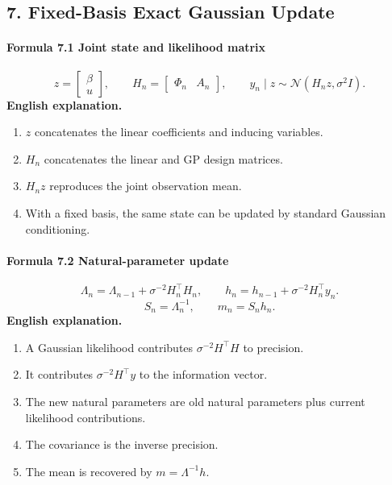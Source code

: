 \documentclass[12pt]{article}
\begin{document}
\subsection{7. Fixed-Basis Exact Gaussian Update}
\paragraph{Formula 7.1 Joint state and likelihood matrix}
\[
z=\begin{bmatrix}\beta\\u\end{bmatrix},
\qquad
H_n=\begin{bmatrix}\Phi_n&A_n\end{bmatrix},
\qquad
y_n\mid z\sim\mathcal N(H_nz,\sigma^2I).
\]
\textbf{English explanation.}
\begin{enumerate}[leftmargin=2em]
\item \(z\) concatenates the linear coefficients and inducing variables.
\item \(H_n\) concatenates the linear and GP design matrices.
\item \(H_nz\) reproduces the joint observation mean.
\item With a fixed basis, the same state can be updated by standard Gaussian conditioning.
\end{enumerate}

\paragraph{Formula 7.2 Natural-parameter update}
\[
\Lambda_n=\Lambda_{n-1}+\sigma^{-2}H_n^\top H_n,
\qquad
h_n=h_{n-1}+\sigma^{-2}H_n^\top y_n.
\]
\[
S_n=\Lambda_n^{-1},
\qquad
m_n=S_nh_n.
\]
\textbf{English explanation.}
\begin{enumerate}[leftmargin=2em]
\item A Gaussian likelihood contributes \(\sigma^{-2}H^\top H\) to precision.
\item It contributes \(\sigma^{-2}H^\top y\) to the information vector.
\item The new natural parameters are old natural parameters plus current likelihood contributions.
\item The covariance is the inverse precision.
\item The mean is recovered by \(m=\Lambda^{-1}h\).
\end{enumerate}
\end{document}
